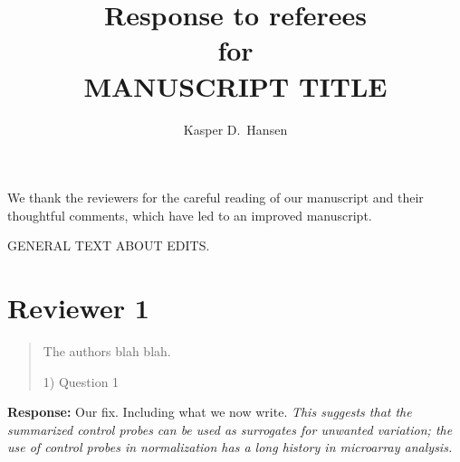 \documentclass[english,letterpaper,pdftex,12pt]{article}
\newenvironment{response}{\begingroup \textbf{Response:}}{\endgroup}
\begin{document}
\setlength{\parindent}{0pt}
\setlength{\parskip}{.4\baselineskip}
\newcommand{\fixme}[1]{{\color{red} #1}}

\title{Response to referees\\
  for \\ MANUSCRIPT TITLE}
\date{}
\author{
  Kasper D.\ Hansen
}

\maketitle

We thank the reviewers for the careful reading of our manuscript and their thoughtful comments, which
have led to an improved manuscript.

GENERAL TEXT ABOUT EDITS.

\section*{Reviewer 1}

\begin{quote}
  The authors blah blah.
  
  1) Question 1
\end{quote}

\begin{response}
  Our fix.  Including what we now write.
  \textit{This suggests that the summarized control probes can be used as surrogates for unwanted
    variation; the use of control probes in normalization has a long history in microarray
    analysis.}
\end{response}

\clearpage



\end{document}
